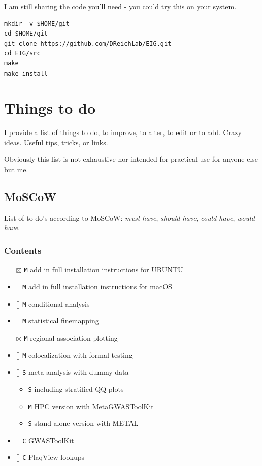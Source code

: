\documentclass[
]{book}
\newcommand{\passthrough}[1]{#1}
\providecommand{\tightlist}{%
  \setlength{\itemsep}{0pt}\setlength{\parskip}{0pt}}
\begin{document}
I am still sharing the code you'll need - you could try this on your system.

\begin{lstlisting}
mkdir -v $HOME/git
cd $HOME/git
git clone https://github.com/DReichLab/EIG.git
cd EIG/src
make
make install
\end{lstlisting}

\hypertarget{todo}{%
\chapter{Things to do}\label{todo}}

I provide a list of things to do, to improve, to alter, to edit or to add. Crazy ideas. Useful tips, tricks, or links.

Obviously this list is not exhaustive nor intended for practical use for anyone else but me.

\hypertarget{moscow}{%
\section{MoSCoW}\label{moscow}}

List of to-do's according to MoSCoW: \emph{must have}, \emph{should have}, \emph{could have}, \emph{would have}.

\hypertarget{contents}{%
\subsection{Contents}\label{contents}}

\begin{itemize}
\tightlist
\item[$\boxtimes$]
  \passthrough{\lstinline!M!} add in full installation instructions for UBUNTU
\item
  {[}{]} \passthrough{\lstinline!M!} add in full installation instructions for macOS
\item
  {[}{]} \passthrough{\lstinline!M!} conditional analysis
\item
  {[}{]} \passthrough{\lstinline!M!} statistical finemapping
\item[$\boxtimes$]
  \passthrough{\lstinline!M!} regional association plotting
\item
  {[}{]} \passthrough{\lstinline!M!} colocalization with formal testing
\item
  {[}{]} \passthrough{\lstinline!S!} meta-analysis with dummy data

  \begin{itemize}
  \tightlist
  \item
    \passthrough{\lstinline!S!} including stratified QQ plots
  \item
    \passthrough{\lstinline!M!} HPC version with MetaGWASToolKit
  \item
    \passthrough{\lstinline!S!} stand-alone version with METAL
  \end{itemize}
\item
  {[}{]} \passthrough{\lstinline!C!} GWASToolKit
\item
  {[}{]} \passthrough{\lstinline!C!} PlaqView lookups
\end{itemize}
\end{document}
